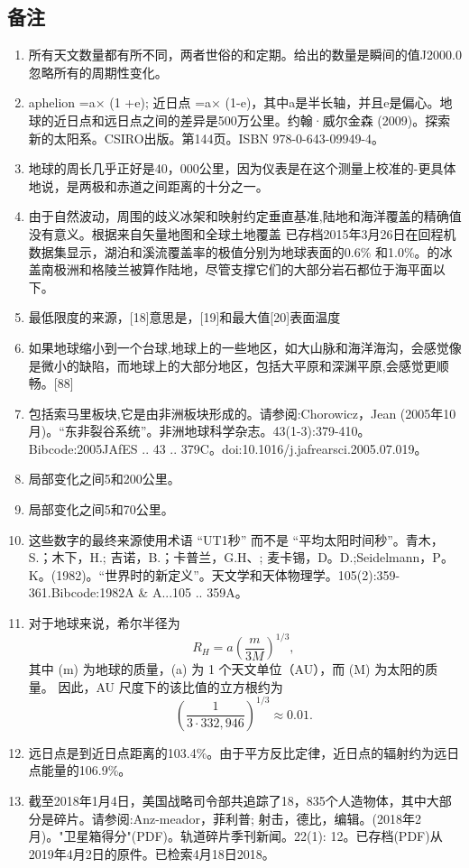 \subsection{备注}
\begin{enumerate}
\item 所有天文数量都有所不同，两者世俗的和定期。给出的数量是瞬间的值J2000.0忽略所有的周期性变化。
\item aphelion =a× (1 +e); 近日点 =a× (1-e)，其中a是半长轴，并且e是偏心。地球的近日点和远日点之间的差异是500万公里。约翰·威尔金森 (2009)。探索新的太阳系。CSIRO出版。第144页。ISBN 978-0-643-09949-4。
\item 地球的周长几乎正好是40，000公里，因为仪表是在这个测量上校准的-更具体地说，是两极和赤道之间距离的十分之一。
\item 由于自然波动，周围的歧义冰架和映射约定垂直基准,陆地和海洋覆盖的精确值没有意义。根据来自矢量地图和全球土地覆盖 已存档2015年3月26日在回程机数据集显示，湖泊和溪流覆盖率的极值分别为地球表面的0.6\% 和1.0\%。的冰盖南极洲和格陵兰被算作陆地，尽管支撑它们的大部分岩石都位于海平面以下。
\item 最低限度的来源，[18]意思是，[19]和最大值[20]表面温度
\item 如果地球缩小到一个台球,地球上的一些地区，如大山脉和海洋海沟，会感觉像是微小的缺陷，而地球上的大部分地区，包括大平原和深渊平原,会感觉更顺畅。[88]
\item 包括索马里板块,它是由非洲板块形成的。请参阅:Chorowicz，Jean (2005年10月)。“东非裂谷系统”。非洲地球科学杂志。43(1-3):379-410。Bibcode:2005JAfES .. 43 .. 379C。doi:10.1016/j.jafrearsci.2005.07.019。
\item 局部变化之间5和200公里。
\item 局部变化之间5和70公里。
\item 这些数字的最终来源使用术语 “UT1秒” 而不是 “平均太阳时间秒”。青木，S.；木下，H.; 吉诺，B.；卡普兰，G.H、; 麦卡锡，D。D.;Seidelmann，P。K。(1982)。“世界时的新定义”。天文学和天体物理学。105(2):359-361.Bibcode:1982A & A...105 .. 359A。
\item 对于地球来说，希尔半径为
\[
R_H = a\left( \frac{m}{3M} \right)^{1/3},~
\]
其中 (m) 为地球的质量，(a) 为 1 个天文单位（AU），而 (M) 为太阳的质量。
因此，AU 尺度下的该比值的立方根约为
\[
\left( \frac{1}{3 \cdot 332{,}946} \right)^{1/3} \approx 0.01.~
\]
\item 远日点是到近日点距离的103.4\%。由于平方反比定律，近日点的辐射约为远日点能量的106.9\%。
\item 截至2018年1月4日，美国战略司令部共追踪了18，835个人造物体，其中大部分是碎片。请参阅:Anz-meador，菲利普; 射击，德比，编辑。(2018年2月)。"卫星箱得分"(PDF)。轨道碎片季刊新闻。22(1): 12。已存档(PDF)从2019年4月2日的原件。已检索4月18日2018。
\end{enumerate}
